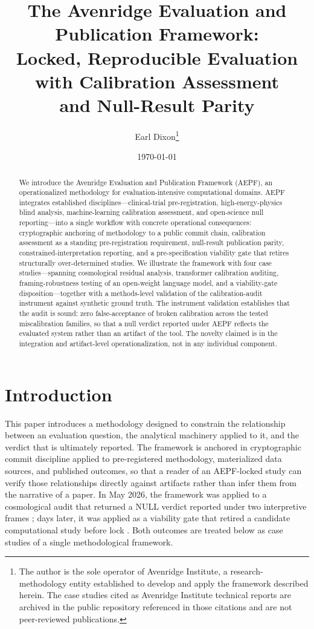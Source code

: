 \documentclass[11pt]{article}
\title{The Avenridge Evaluation and Publication Framework:\\
Locked, Reproducible Evaluation with Calibration Assessment\\
and Null-Result Parity}
\author{Earl Dixon\thanks{The author is the sole operator of
Avenridge Institute, a research-methodology entity established to
develop and apply the framework described herein. The case studies
cited as Avenridge Institute technical reports are archived in the
public repository referenced in those citations and are not
peer-reviewed publications.}}
\date{\today}
\begin{document}
\maketitle

\begin{abstract}
We introduce the Avenridge Evaluation and Publication Framework
(AEPF), an operationalized methodology for evaluation-intensive
computational domains. AEPF integrates established
disciplines---clinical-trial pre-registration, high-energy-physics
blind analysis, machine-learning calibration assessment, and
open-science null reporting---into a single workflow with concrete
operational consequences: cryptographic anchoring of methodology to
a public commit chain, calibration assessment as a standing
pre-registration requirement, null-result publication parity,
constrained-interpretation reporting, and a pre-specification
viability gate that retires structurally over-determined studies. We
illustrate the framework with four case studies---spanning
cosmological residual analysis, transformer calibration auditing,
framing-robustness testing of an open-weight language model, and a
viability-gate disposition---together with a methods-level validation
of the calibration-audit instrument against synthetic ground truth.
The instrument validation establishes that the audit is sound: zero
false-acceptance of broken calibration across the tested
miscalibration families, so that a null verdict reported under AEPF
reflects the evaluated system rather than an artifact of the tool.
The novelty claimed is in the integration and artifact-level
operationalization, not in any individual component.
\end{abstract}

\section{Introduction}
\label{sec:introduction}

This paper introduces a methodology designed to constrain the
relationship between an evaluation question, the analytical
machinery applied to it, and the verdict that is ultimately
reported. The framework is anchored in cryptographic commit
discipline applied to pre-registered methodology, materialized
data sources, and published outcomes, so that a reader of an
AEPF-locked study can verify those relationships directly against
artifacts rather than infer them from the narrative of a paper.
In May 2026, the framework was applied to a cosmological audit
that returned a NULL verdict reported under two interpretive
frames \cite{dixon2026ersaf}; days later, it was applied as a
viability gate that retired a candidate computational study
before lock \cite{dixon2026dynametrixhrrr}. Both outcomes are
treated below as case studies of a single methodological
framework.
\end{document}
